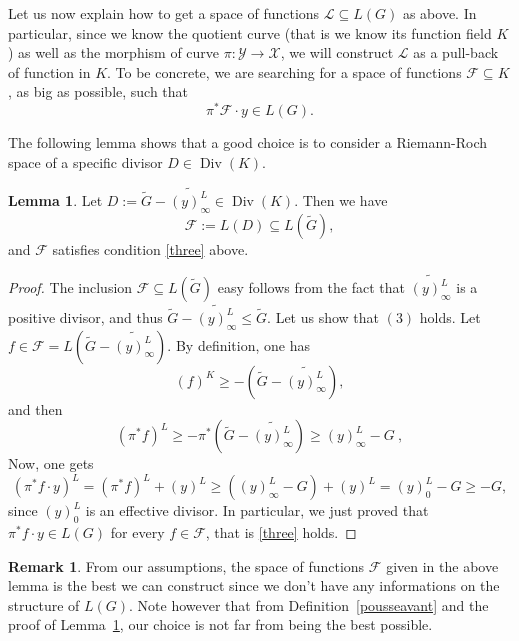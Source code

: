 \documentclass[10pt]{article}
\theoremstyle{definition}
\newtheorem{lem1}[thm]{Lemma}
\theoremstyle{definition}
\newtheorem{rq1}[thm]{Remark}
\theoremstyle{definition}
\newcommand{\s}{\vspace{0.3cm}}
\newcommand{\cd}{\cdot}
\newcommand{\su}{\subseteq}
\newcommand{\X}{\mathcal{X}}
\newcommand{\Y}{\mathcal{Y}}
\newcommand{\Div}{\operatorname{Div}}
\newcommand{\hugues}[1]{\textcolor{blue}{#1}}
\newcommand{\notehugues}[1]{\marginpar{\small\hugues{#1}}}
\begin{document}
Let us now explain how to get a space of functions $\mathcal{L} \su L(G)$ as above. In particular, since we know the quotient curve (that is we know its function field $K$) as well as the morphism of curve $\pi : \Y \rightarrow \X$, we will construct $\mathcal{L}$ as a pull-back of function in $K$. To be concrete, we are searching for a space of functions $\mathcal{F} \su K$, as big as possible, such that 
\begin{equation} \label{three}
\pi^*\mathcal{F} \cd y \in L(G). 
\end{equation}

\color{purple} The following lemma shows that a good choice is to consider a Riemann-Roch space of a specific divisor $D \in \Div(K)$.   

\s

\begin{lem1} \label{constructionD} Let $D := \widetilde{G}-\widetilde{(y)^L_{\infty}} \in \Div(K)$. Then we have
\[\mathcal{F} := L(D) \su L(\tilde{G}),\]
and $\mathcal{F}$ satisfies condition \eqref{three} above.
\end{lem1}
\color{black}

\s

\begin{proof}
The inclusion $\mathcal{F} \su L(\tilde{G})$ easy follows from the fact that $\widetilde{(y)^L_{\infty}}$ is a positive divisor, and thus $\tilde{G}-\widetilde{(y)^L_{\infty}} \leq \tilde{G}$. Let us show that $(3)$ holds. Let $f \in \mathcal{F} =  L\left(\tilde{G}-\widetilde{(y)^L_{\infty}}\right)$. By definition, one has 
\[(f)^K \geq -\left(\tilde{G}-\widetilde{(y)^L_{\infty}}\right),\]
and then
\[(\pi^*f)^L \geq -\pi^*\left(\tilde{G}-\widetilde{(y)^L_{\infty}}\right) \geq (y)^L_{\infty} - G \ ,\]
Now, one gets 
\[(\pi^*f \cd y)^L = (\pi^*f)^L  + (y)^L \geq  ((y)^L_{\infty} - G)+(y)^L = (y)^L_0 - G \geq -G,\]
since $(y)^L_0$ is an effective divisor. In particular, we just proved that $\pi^*f \cd y \in L(G)$ for every $f \in \mathcal{F}$, that is \eqref{three} holds.
\end{proof}

\s

\color{purple}
\begin{rq1}  \label{remark5}
From our assumptions, the space of functions $\mathcal{F}$ given in the above lemma is the best we can construct since we don't have any informations on the structure of $L(G)$. Note however that from Definition~\ref{pousseavant} and the proof of Lemma~\ref{constructionD}, our choice is not far from being the best possible.  
\end{rq1}
\color{black}
\end{document}
